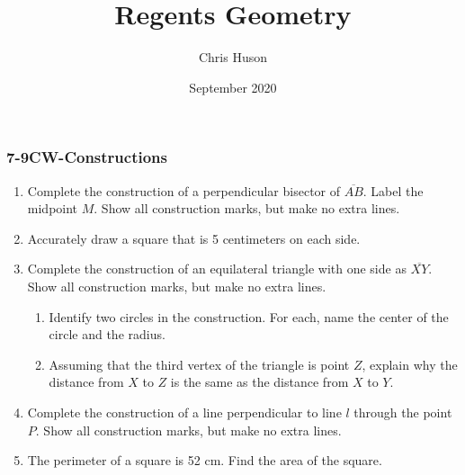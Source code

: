 \documentclass[12pt, twoside]{article}
\title{Regents Geometry}
\author{Chris Huson}
\date{September 2020}
\begin{document}
\subsubsection*{7-9CW-Constructions}
\begin{enumerate}
\item Complete the construction of a perpendicular bisector of $\overline{AB}$. Label the midpoint $M$. Show all construction marks, but make no extra lines. \vspace{2cm}
    \begin{center}
    \end{center} \vspace{4cm}

\item Accurately draw a square that is 5 centimeters on each side.

\newpage
\item Complete the construction of an equilateral triangle with one side as $\overline{XY}$. Show all construction marks, but make no extra lines. \vspace{3cm}
  \begin{center}
  \end{center} \vspace{3cm}
  \begin{enumerate}
    \item Identify two circles in the construction. For each, name the center of the circle and the radius.  \vspace{3cm}
    \item Assuming that the third vertex of the triangle is point $Z$, explain why the distance from $X$ to $Z$ is the same as the distance from $X$ to $Y$.
  \end{enumerate}

\newpage
\item Complete the construction of a line perpendicular to line $l$ through the point $P$. Show all construction marks, but make no extra lines. \vspace{3cm}
  \begin{center}
  \end{center} \vspace{7cm}

\item The perimeter of a square is 52 cm. Find the area of the square.


\end{enumerate}
\end{document}
